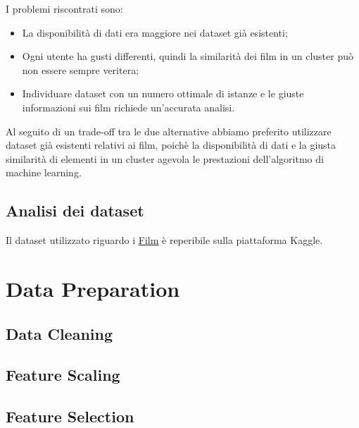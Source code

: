 \documentclass[a4paper, 12pt]{report}
\begin{document}
            I problemi riscontrati sono:
            \begin{itemize}
                \item La disponibilità di dati era maggiore nei dataset già esistenti;
                \item Ogni utente ha gusti differenti, quindi la similarità dei film in un cluster può non essere sempre
                      veritera;
                \item Individuare dataset con un numero ottimale di istanze e le giuste informazioni sui film richiede
                      un'accurata analisi.
            \end{itemize}
            Al seguito di un trade-off tra le due alternative abbiamo preferito utilizzare dataset già esistenti relativi ai film,
            poichè la disponibilità di dati e la giusta similarità di elementi in un cluster agevola le prestazioni dell'algoritmo
            di machine learning.

        \section{Analisi dei dataset}\label{sec:analisi-dei-dataset}
            Il dataset utilizzato riguardo i \href{https://www.kaggle.com/datasets/stefanoleone992/filmtv-movies-dataset?resource=download}{\underline{Film}}
            è reperibile sulla piattaforma Kaggle.




    \chapter{Data Preparation}\label{ch:data-preparation}


        \section{Data Cleaning}\label{sec:data-cleaning}


        \section{Feature Scaling}\label{sec:feature-scaling}


        \section{Feature Selection}\label{sec:feature-selection}
\end{document}
